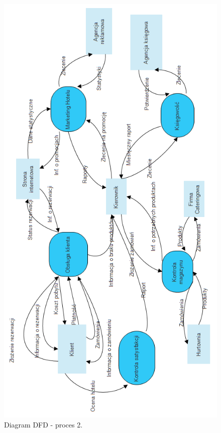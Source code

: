 \documentclass[a4paper, 11pt]{article}
\begin{document}
	\begin{figure}[H]%
			\center
			\includegraphics[scale=0.7]{Img/DFDpoziom0.png}
			\caption{Diagram DFD - proces 2.}
	\end{figure}
\end{document}
